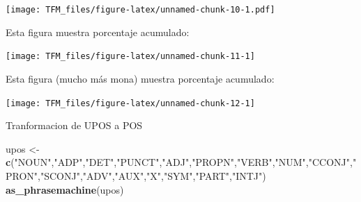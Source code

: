 \documentclass[]{article}
\newenvironment{Shaded}{\begin{snugshade}}{\end{snugshade}}
\newcommand{\DataTypeTok}[1]{\textcolor[rgb]{0.13,0.29,0.53}{#1}}
\newcommand{\DecValTok}[1]{\textcolor[rgb]{0.00,0.00,0.81}{#1}}
\newcommand{\KeywordTok}[1]{\textcolor[rgb]{0.13,0.29,0.53}{\textbf{#1}}}
\newcommand{\NormalTok}[1]{#1}
\newcommand{\OperatorTok}[1]{\textcolor[rgb]{0.81,0.36,0.00}{\textbf{#1}}}
\newcommand{\StringTok}[1]{\textcolor[rgb]{0.31,0.60,0.02}{#1}}
\begin{document}
\begin{Shaded}
\end{Shaded}

\texttt{[image: TFM\_files/figure-latex/unnamed-chunk-10-1.pdf]}

Esta figura muestra porcentaje acumulado:

\begin{center}\texttt{[image: TFM\_files/figure-latex/unnamed-chunk-11-1]} \end{center}

Esta figura (mucho más mona) muestra porcentaje acumulado:

\begin{center}\texttt{[image: TFM\_files/figure-latex/unnamed-chunk-12-1]} \end{center}

Tranformacion de UPOS a POS

\begin{Shaded}
\begin{Highlighting}[]
\NormalTok{upos <-}\StringTok{ }\KeywordTok{c}\NormalTok{(}\StringTok{"NOUN"}\NormalTok{,}\StringTok{"ADP"}\NormalTok{,}\StringTok{"DET"}\NormalTok{,}\StringTok{"PUNCT"}\NormalTok{,}\StringTok{"ADJ"}\NormalTok{,}\StringTok{"PROPN"}\NormalTok{,}\StringTok{"VERB"}\NormalTok{,}\StringTok{"NUM"}\NormalTok{,}\StringTok{"CCONJ"}\NormalTok{,}\StringTok{"PRON"}\NormalTok{,}\StringTok{"SCONJ"}\NormalTok{,}\StringTok{"ADV"}\NormalTok{,}\StringTok{"AUX"}\NormalTok{,}\StringTok{"X"}\NormalTok{,}\StringTok{"SYM"}\NormalTok{,}\StringTok{"PART"}\NormalTok{,}\StringTok{"INTJ"}\NormalTok{)}
\KeywordTok{as_phrasemachine}\NormalTok{(upos)}
\end{Highlighting}
\end{Shaded}
\end{document}

